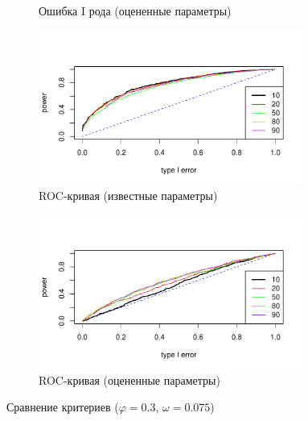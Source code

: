 \documentclass[specialist,
substylefile = spbu_report.rtx,
subf,href,colorlinks=true, 12pt]{disser}
\theoremstyle{definition}
\begin{document}
\begin{figure}[h!]
\begin{subfigure}[t]{0.5\textwidth}
		\caption{Ошибка I рода (оцененные параметры)}
		\label{fig:extract_type1error}
	\end{subfigure}
	\bigskip
	\begin{subfigure}[t]{0.5\textwidth}
		\centering
		\includegraphics[width=0.95\textwidth]{img/roc_phi3_omega0075.pdf}
		\caption{ROC-кривая (известные параметры)}
		\label{fig:arima_roc}
	\end{subfigure}\hspace{\fill}
	\begin{subfigure}[t]{0.5\textwidth}
		\centering
		\includegraphics[width=0.95\textwidth]{img/roc_phi3est_omega0075.pdf}
		\caption{ROC-кривая (оцененные параметры)}
		\label{fig:extract_roc}
	\end{subfigure}
	\caption{Сравнение критериев ($\varphi=0.3$, $\omega=0.075$)}
\end{figure}
\end{document}

